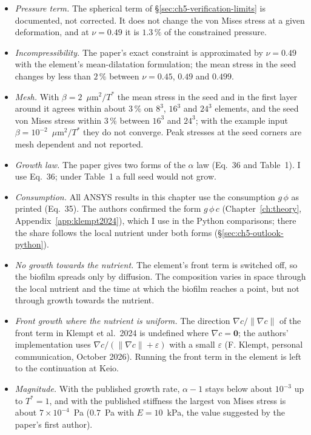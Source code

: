 \begin{itemize}
      points, $\phi_{\min}$, the antibiotic uptake and the converted $\beta$ are not
      given by the papers. All are reported with their sensitivity.
\item \emph{Pressure term.} The spherical term of
      \S\ref{sec:ch5-verification-limits} is documented, not corrected. It does
      not change the von Mises stress at a given deformation, and at
      $\nu=0.49$ it is $1.3\,\%$ of the constrained pressure.
\item \emph{Incompressibility.} The paper's exact constraint is approximated by
      $\nu=0.49$ with the element's mean-dilatation formulation; the mean
      stress in the seed changes by less than $2\,\%$ between $\nu=0.45$,
      $0.49$ and $0.499$.
\item \emph{Mesh.} With $\beta=2$~$\mu$m$^2/T^*$ the mean stress in the seed
      and in the first layer around it agrees within about $3\,\%$ on $8^3$,
      $16^3$ and $24^3$ elements, and the seed von Mises stress within
      $3\,\%$ between $16^3$ and $24^3$; with the example input
      $\beta=10^{-2}$~$\mu$m$^2/T^*$ they do not converge. Peak stresses at the seed corners
      are mesh dependent and not reported.
\item \emph{Growth law.} The paper gives two forms of the $\alpha$ law
      (Eq.~36 and Table~1). I use Eq.~36; under Table~1 a full seed would not
      grow.
\item \emph{Consumption.} All ANSYS results in this chapter use the consumption
      $g\,\phi$ as printed (Eq.~35). The authors confirmed the form $g\,\phi\,c$
      (Chapter~\ref{ch:theory}, Appendix~\ref{app:klempt2024}), which I use in the
      Python comparisons; there the share follows the local nutrient under both
      forms (\S\ref{sec:ch5-outlook-python}).
\item \emph{No growth towards the nutrient.} The element's front term is
      switched off, so the biofilm spreads only by diffusion. The composition
      varies in space through the local nutrient and the time at which the
      biofilm reaches a point, but not through growth towards the nutrient.
\item \emph{Front growth where the nutrient is uniform.} The direction
      $\nabla c/\|\nabla c\|$ of the front term in Klempt et al.\ 2024 is
      undefined where $\nabla c=\mathbf 0$; the authors' implementation uses
      $\nabla c/(\|\nabla c\|+\varepsilon)$ with a small $\varepsilon$ (F. Klempt,
      personal communication, October 2026). Running
      the front term in the element is left to the continuation at Keio.
\item \emph{Magnitude.} With the published growth rate, $\alpha-1$ stays below
      about $10^{-3}$ up to $T^*=1$, and with the published stiffness the
      largest von Mises stress is about $7\times10^{-4}$~Pa ($0.7$~Pa with
      $E=10$~kPa, the value suggested by the paper's first author).
\end{itemize}


